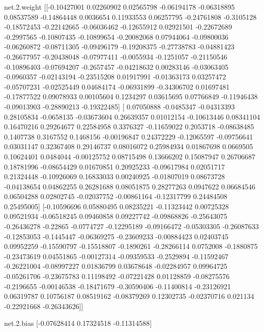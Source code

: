 net.2.weight [[-0.10427001  0.02260902  0.02565798 -0.06194178 -0.06318895  0.08537589
  -0.14864448  0.0036654   0.11933553  0.06257795 -0.24761808 -0.3105128
  -0.18572453 -0.22142665 -0.06036462 -0.12655912  0.02921501 -0.22672689
  -0.2997565  -0.10807435 -0.10899654 -0.20082068  0.07944064 -0.09800036
  -0.06260872 -0.08711305 -0.09496179 -0.19208375 -0.27738783 -0.04881423
  -0.26677957 -0.20438048 -0.07977411 -0.0055934  -0.1251057  -0.21150546
  -0.10896403 -0.07694207 -0.2657457  -0.04218632  0.00283146 -0.03063405
  -0.0960357  -0.02143194 -0.23515208  0.01917991 -0.01363173  0.03257472
  -0.05707231 -0.02525449  0.04684174 -0.06931899 -0.34306702  0.01697481
  -0.17877522  0.09078933  0.00105604  0.1234297   0.03615695  0.07766849
  -0.11946438 -0.09013903 -0.28890213 -0.19322485]
 [ 0.07050888 -0.0485347  -0.04313393  0.28105834 -0.0658135  -0.03673604
   0.26639357  0.01012154 -0.10613446  0.08341104  0.16470216  0.29264677
   0.22584958  0.3376327  -0.11659022  0.2053718  -0.08638485  0.1407738
   0.3167552   0.1468156  -0.00196847  0.24372229 -0.12065597 -0.09756641
   0.03031147  0.32367408  0.29146737  0.08016072  0.25984934  0.01867698
   0.0669505   0.10624401  0.0484044  -0.00125752  0.08715498  0.13666202
   0.15087947  0.26706687  0.18781996 -0.08654429  0.01670851  0.20925233
  -0.09617984  0.02051717  0.21324448 -0.10926069  0.16833033  0.00240925
  -0.01807019  0.08673728 -0.04138654  0.04862255  0.26281688  0.08051875
   0.28277263  0.0947622   0.06684546  0.06504288  0.02802745 -0.02037752
  -0.00861164 -0.12317799  0.24484508  0.25495005]
 [-0.10596696  0.05880495  0.08235221 -0.11323442  0.00725328  0.09521934
  -0.06518245  0.09460858  0.09227742 -0.09868826 -0.25643075 -0.26436278
  -0.22865    -0.0774727  -0.12295189 -0.09166472 -0.05303305 -0.26087633
  -0.12853053 -0.1445447  -0.06369275 -0.23609233 -0.00884423  0.02403745
   0.09952259 -0.15590797 -0.15518807 -0.1890261  -0.28266114  0.0752008
  -0.1880875  -0.23473619  0.04551865 -0.00127314 -0.09359533 -0.2529894
  -0.11592467 -0.26221004 -0.08997227  0.01836799  0.03678648 -0.02284957
   0.09964725 -0.05261706 -0.23675783  0.11198492 -0.07221428  0.01128859
  -0.08275576 -0.2196655  -0.00146538 -0.18471679 -0.30590406 -0.11400814
  -0.23126921  0.06319787  0.10756187  0.08519162 -0.08379269  0.12302735
  -0.02370716  0.021134   -0.22921668 -0.26343626]] 

net.2.bias [-0.07628414  0.17324518 -0.11314588] 


